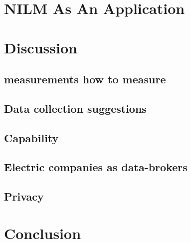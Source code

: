 \glsresetall 


\glsresetall
 

\glsresetall
 

\glsresetall


\glsresetall
\chapter{NILM As An Application} 

\glsresetall
\chapter{Discussion}

\section{measurements how to measure}
\section{Data collection suggestions}
\section{Capability}
\section{Electric companies as data-brokers }
\section{Privacy}

\glsresetall
\chapter{Conclusion}
\begingroup
	\raggedright
	
\endgroup

